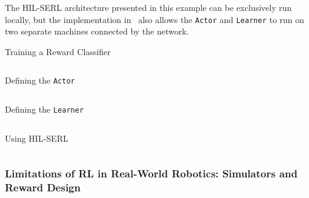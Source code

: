 The HIL-SERL architecture presented in this example can be exclusively run locally, but the implementation in \lerobot~also allows the \texttt{Actor} and \texttt{Learner} to run on two separate machines connected by the network.

\begin{pbox}[label={ex:train_reward_classifier}]{Training a Reward Classifier}
    \inputminted{python}{snippets/ch3/01_reward_classifier.py}
\end{pbox}

\begin{pbox}[label={ex:hil_serl_defining_actor}]{Defining the \texttt{Actor}}
    \inputminted{python}{snippets/ch3/02_actor.py}
\end{pbox}


\begin{pbox}[label={ex:hil_serl_defining_learner}]{Defining the \texttt{Learner}}
    \inputminted{python}{snippets/ch3/03_learner.py}
\end{pbox}

\begin{pbox}[label={ex:hil_serl_full}]{Using HIL-SERL}
    \inputminted{python}{snippets/ch3/04_hil_serl.py}
\end{pbox}


\subsubsection{Limitations of RL in Real-World Robotics: Simulators and Reward Design}

